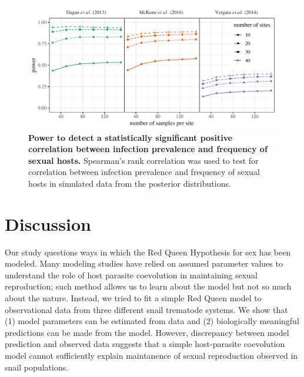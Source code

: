 \documentclass{article}\usepackage[]{graphicx}\usepackage[]{color}
\begin{document}
\begin{figure}[!ht]
\includegraphics[width=\textwidth]{../fig/power.pdf}
\caption{{\bf Power to detect a statistically significant positive correlation between infection prevalence and frequency of sexual hosts.}
Spearman's rank correlation was used to test for correlation between infection prevalence and frequency of sexual hosts in simulated data from the posterior distributions.
}
\label{fig:power}
\end{figure}

\section{Discussion}

Our study questions ways in which the Red Queen Hypothesis for sex has been modeled.
Many modeling studies have relied on assumed parameter values to understand the role of host parasite coevolution in maintaining sexual reproduction; 
such method allows us to learn about the model but not so much about the nature.
Instead, we tried to fit a simple Red Queen model to observational data from three different snail trematode systems.
We show that (1) model parameters can be estimated from data and (2) biologically meaningful predictions can be made from the model.
However, discrepancy between model prediction and observed data suggests that a simple host-parasite coevolution model cannot sufficiently explain maintanence of sexual reproduction observed in snail populations.
\end{document}
